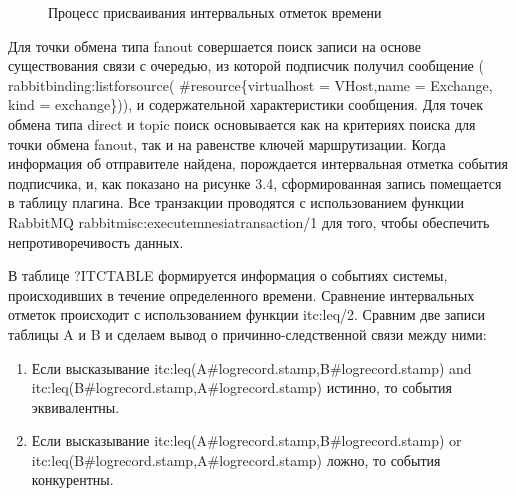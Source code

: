 {\begin{figure}
\caption{Процесс присваивания интервальных отметок времени}
\end{figure}
Для точки обмена типа fanout совершается поиск записи на основе существования связи с очередью, из которой подписчик получил сообщение ( rabbit\underline{\hspace{0.25cm}}binding:list\underline{\hspace{0.25cm}}for\underline{\hspace{0.25cm}}source( \#resource\{virtual\underline{\hspace{0.25cm}}host = VHost,name = Exchange, kind = exchange\})), и содержательной характеристики сообщения. Для точек обмена типа direct и topic поиск основывается как на критериях поиска для точки обмена fanout, так и на равенстве ключей маршрутизации. Когда информация об отправителе найдена, порождается интервальная отметка события подписчика, и, как показано на рисунке 3.4, сформированная запись помещается в таблицу плагина. Все транзакции проводятся с использованием функции RabbitMQ rabbit\underline{\hspace{0.25cm}}misc:execute\underline{\hspace{0.25cm}}mnesia\underline{\hspace{0.25cm}}transaction/1 для того, чтобы обеспечить непротиворечивость данных.\par
В таблице ?ITC\underline{\hspace{0.25cm}}TABLE формируется информация о событиях системы, происходивших в течение определенного времени. Сравнение интервальных отметок происходит с использованием функции itc:leq/2. Сравним две записи таблицы A и B и сделаем вывод о причинно-следственной связи между ними:
\begin{enumerate}
\item Если высказывание itc:leq(A\#log\underline{\hspace{0.25cm}}record.stamp,B\#log\underline{\hspace{0.25cm}}record.stamp) and itc:leq(B\#log\underline{\hspace{0.25cm}}record.stamp,A\#log\underline{\hspace{0.25cm}}record.stamp) истинно, то события эквивалентны.
\item Если высказывание itc:leq(A\#log\underline{\hspace{0.25cm}}record.stamp,B\#log\underline{\hspace{0.25cm}}record.stamp) or itc:leq(B\#log\underline{\hspace{0.25cm}}record.stamp,A\#log\underline{\hspace{0.25cm}}record.stamp) ложно, то события конкурентны.

\end{enumerate}}
